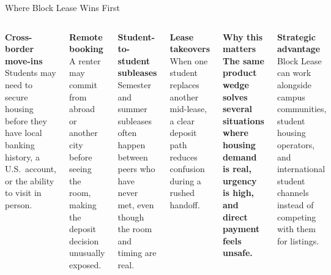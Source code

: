 \documentclass[10pt,aspectratio=169]{beamer}
\newcommand{\infocard}[2]{%
\begin{tcolorbox}[pitchcard]
{\normalsize\bfseries #1}\\[0.8mm]
{\footnotesize\color{muted} #2}
\end{tcolorbox}
}
\newcommand{\thesisbox}[2]{%
\begin{tcolorbox}[darkcard]
{\footnotesize\bfseries\textcolor{white!68}{#1}}\\[1.5mm]
{\large\bfseries #2}
\end{tcolorbox}
}
\begin{document}
\begin{frame}[shrink=6]{Where Block Lease Wins First}
\begin{columns}[T,totalwidth=\textwidth]
\begin{columns}[T,totalwidth=\linewidth]
\infocard{Cross-border move-ins}{Students may need to secure housing before they have local banking history, a U.S.\ account, or the ability to visit in person.}
\vspace{1.6mm}
\infocard{Remote booking}{A renter may commit from abroad or another city before seeing the room, making the deposit decision unusually exposed.}
\infocard{Student-to-student subleases}{Semester and summer subleases often happen between peers who have never met, even though the room and timing are real.}
\vspace{1.6mm}
\infocard{Lease takeovers}{When one student replaces another mid-lease, a clear deposit path reduces confusion during a rushed handoff.}
\end{columns}

\thesisbox{Why this matters}{The same product wedge solves several situations where housing demand is real, urgency is high, and direct payment feels unsafe.}
\vspace{2.4mm}
\begin{tcolorbox}[pitchcard]
{\normalsize\bfseries Strategic advantage}\\[1mm]
{\footnotesize\color{muted} Block Lease can work alongside campus communities, student housing operators, and international student channels instead of competing with them for listings.}
\end{tcolorbox}
\end{columns}
\end{frame}
\end{document}

